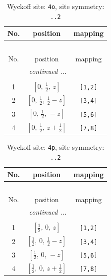 \documentclass[fleqn,8pt]{jsarticle}
\begin{document}
\renewcommand{\arraystretch}{1.2}
\begin{longtable}{ccc}
\caption{Wyckoff site: {\tt 4o}, site symmetry: {\tt ..2}}
 \\
 \hline \hline
No. & position & mapping \\ \hline \endfirsthead

\multicolumn{2}{l}{\tablename\ \thetable{}} \\
 \hline \hline
No. & position & mapping \\ \hline \endhead

 \hline \hline
\multicolumn{2}{r}{\footnotesize\it continued ...} \\ \endfoot

 \hline \hline
\multicolumn{2}{r}{} \\ \endlastfoot

1 & $\left[ 0,\, \frac{1}{2},\, z \right]$ & {\tt [1,2]} \\ \hline
2 & $\left[ 0,\, \frac{1}{2},\, \frac{1}{2} - z \right]$ & {\tt [3,4]} \\ \hline
3 & $\left[ 0,\, \frac{1}{2},\, - z \right]$ & {\tt [5,6]} \\ \hline
4 & $\left[ 0,\, \frac{1}{2},\, z + \frac{1}{2} \right]$ & {\tt [7,8]} \\
\end{longtable}
\renewcommand{\arraystretch}{1.2}
\begin{longtable}{ccc}
\caption{Wyckoff site: {\tt 4p}, site symmetry: {\tt ..2}}
 \\
 \hline \hline
No. & position & mapping \\ \hline \endfirsthead

\multicolumn{2}{l}{\tablename\ \thetable{}} \\
 \hline \hline
No. & position & mapping \\ \hline \endhead

 \hline \hline
\multicolumn{2}{r}{\footnotesize\it continued ...} \\ \endfoot

 \hline \hline
\multicolumn{2}{r}{} \\ \endlastfoot

1 & $\left[ \frac{1}{2},\, 0,\, z \right]$ & {\tt [1,2]} \\ \hline
2 & $\left[ \frac{1}{2},\, 0,\, \frac{1}{2} - z \right]$ & {\tt [3,4]} \\ \hline
3 & $\left[ \frac{1}{2},\, 0,\, - z \right]$ & {\tt [5,6]} \\ \hline
4 & $\left[ \frac{1}{2},\, 0,\, z + \frac{1}{2} \right]$ & {\tt [7,8]} \\
\end{longtable}
\end{document}
